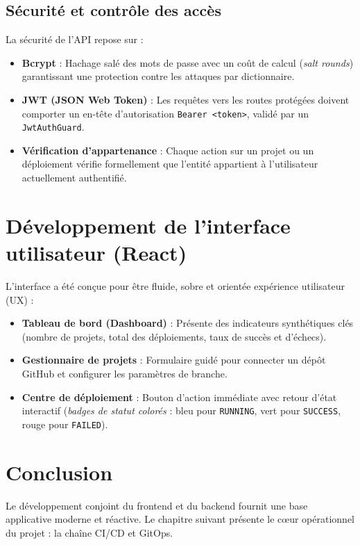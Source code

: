 \documentclass[12pt,a4paper,oneside]{report}
\begin{document}
\subsection{Sécurité et contrôle des accès}
La sécurité de l'API repose sur :
\begin{itemize}[label=$\bullet$]
    \item \textbf{Bcrypt} : Hachage salé des mots de passe avec un coût de calcul (\textit{salt rounds}) garantissant une protection contre les attaques par dictionnaire.
    \item \textbf{JWT (JSON Web Token)} : Les requêtes vers les routes protégées doivent comporter un en-tête d'autorisation \texttt{Bearer <token>}, validé par un \texttt{JwtAuthGuard}.
    \item \textbf{Vérification d'appartenance} : Chaque action sur un projet ou un déploiement vérifie formellement que l'entité appartient à l'utilisateur actuellement authentifié.
\end{itemize}

\section{Développement de l'interface utilisateur (React)}
L'interface a été conçue pour être fluide, sobre et orientée expérience utilisateur (UX) :
\begin{itemize}[label=$\bullet$]
    \item \textbf{Tableau de bord (Dashboard)} : Présente des indicateurs synthétiques clés (nombre de projets, total des déploiements, taux de succès et d'échecs).
    \item \textbf{Gestionnaire de projets} : Formulaire guidé pour connecter un dépôt GitHub et configurer les paramètres de branche.
    \item \textbf{Centre de déploiement} : Bouton d'action immédiate avec retour d'état interactif (\textit{badges de statut colorés} : bleu pour \texttt{RUNNING}, vert pour \texttt{SUCCESS}, rouge pour \texttt{FAILED}).
\end{itemize}

\section{Conclusion}
Le développement conjoint du frontend et du backend fournit une base applicative moderne et réactive. Le chapitre suivant présente le cœur opérationnel du projet : la chaîne CI/CD et GitOps.

\clearpage
\end{document}
